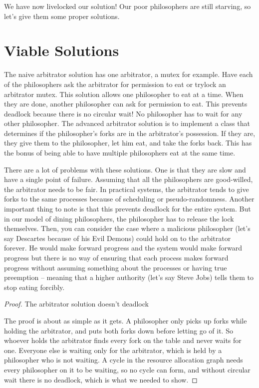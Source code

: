 We have now livelocked our solution! Our poor philosophers are still starving, so let's give them some proper solutions.

\section{Viable Solutions}

The naive arbitrator solution has one arbitrator, a mutex for example.
Have each of the philosophers ask the arbitrator for permission to eat or trylock an arbitrator mutex.
This solution allows one philosopher to eat at a time.
When they are done, another philosopher can ask for permission to eat.
This prevents deadlock because there is no circular wait! No philosopher has to wait for any other philosopher.
The advanced arbitrator solution is to implement a class that determines if the philosopher's forks are in the arbitrator's possession.
If they are, they give them to the philosopher, let him eat, and take the forks back.
This has the bonus of being able to have multiple philosophers eat at the same time.

There are a lot of problems with these solutions.
One is that they are slow and have a single point of failure.
Assuming that all the philosophers are good-willed, the arbitrator needs to be fair.
In practical systems, the arbitrator tends to give forks to the same processes because of scheduling or pseudo-randomness.
Another important thing to note is that this prevents deadlock for the entire system.
But in our model of dining philosophers, the philosopher has to release the lock themselves.
Then, you can consider the case where a malicious philosopher (let's say Descartes because of his Evil Demons) could hold on to the arbitrator forever.
He would make forward progress and the system would make forward progress but there is no way of ensuring that each process makes forward progress without assuming something about the processes or having true preemption -- meaning that a higher authority (let's say Steve Jobs) tells them to stop eating forcibly.


\begin{proof} The arbitrator solution doesn't deadlock
	
	The proof is about as simple as it gets.
	A philosopher only picks up forks while holding the arbitrator, and puts both forks down before letting go of it.
	So whoever holds the arbitrator finds every fork on the table and never waits for one.
	Everyone else is waiting only for the arbitrator, which is held by a philosopher who is not waiting.
	A cycle in the resource allocation graph needs every philosopher on it to be waiting, so no cycle can form, and without circular wait there is no deadlock, which is what we needed to show.
	
\end{proof}

